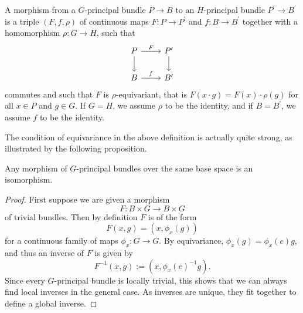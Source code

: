 \begin{definition}
    \label{bundles:def:principal_bundles_morphism}
    A morphism from a $G$-principal bundle $P \to B$ to an $H$-principal bundle $P^\prime \to B^\prime$ is a triple $(F,f, \rho)$ of continuous maps $F \colon P \to P^\prime$ and $f \colon B \to B^\prime$ together with a homomorphism $\rho \colon G \to H$, such that 
    \[\begin{tikzcd}
	P & {P^\prime} \\
	B & {B^\prime}
	\arrow["F", from=1-1, to=1-2]
	\arrow[from=1-1, to=2-1]
	\arrow[from=1-2, to=2-2]
	\arrow["f", from=2-1, to=2-2]
    \end{tikzcd}\]
    commutes and such that $F$ is $\rho$-equivariant, that is $F(x \cdot g) = F(x) \cdot \rho(g)$ for all $x \in P$ and $g \in G$. If $G=H$, we assume $\rho$ to be the identity, and if $B = B^\prime$, we assume $f$ to be the identity.
\end{definition}

The condition of equivariance in the above definition is actually quite strong, as illustrated by the following proposition.

\begin{proposition}
    \label{bundles:prop:morphisms_of_principal_bundles}
    Any morphism of $G$-principal bundles over the same base space is an isomorphism.
\end{proposition}

\begin{proof}
    First suppose we are given a morphism 
    \[  
        F \colon B \times G \to B \times G
    \]
    of trivial bundles. Then by definition $F$ is of the form 
    \[
    F(x,g) = (x,\phi_x(g))
    \]
    for a continuous family of maps $\phi_x \colon G \to G$. By equivariance, $\phi_x(g) = \phi_x(e) g$, and thus an inverse of $F$ is given by
    \[
    F^{-1}(x,g) := (x, \phi_x(e)^{-1} g).
    \]
    Since every $G$-principal bundle is locally trivial, this shows that we can always find local inverses in the general case. As inverses are unique, they fit together to define a global inverse.
\end{proof}

